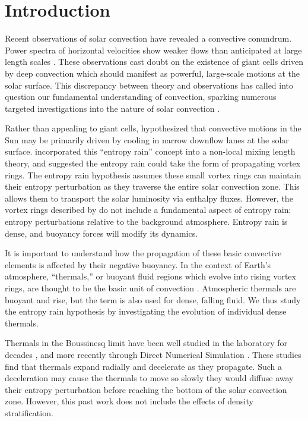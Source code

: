 \documentclass[twocolumn, amsmath, amsfonts, amssymb, trackchanges]{aastex62}
\begin{document}
\section{Introduction}
\label{sec:intro}
Recent observations of solar convection have revealed a convective conundrum.
Power spectra of horizontal velocities show weaker flows than anticipated at large length scales \citep{hanasoge&all2012, greer&all2015}.
These observations cast doubt on the existence of giant cells driven by deep convection which should manifest as powerful, large-scale motions at the solar surface. 
This discrepancy between theory and observations has called into question our fundamental understanding of convection, sparking numerous targeted investigations into the nature of solar convection  \citep{featherstone&hindman2016, omara&all2016, cossette&rast2016, kapyla&all2017, hotta2017}.

Rather than appealing to giant cells, \cite{spruit1997} hypothesized that convective motions in the Sun may be primarily driven by cooling in narrow downflow lanes at the solar surface.
\citet{brandenburg2016} incorporated this ``entropy rain'' concept into a non-local mixing length theory, and suggested the entropy rain could take the form of propagating vortex rings.
The entropy rain hypothesis assumes these small vortex rings can maintain their entropy perturbation as they traverse the entire solar convection zone.
This allows them to transport the solar luminosity via enthalpy fluxes.
However, the vortex rings described by \citet{brandenburg2016} do not include a fundamental aspect of entropy rain: entropy perturbations relative to the background atmosphere.
Entropy rain is dense, and buoyancy forces will modify its dynamics.

It is important to understand how the propagation of these basic convective elements is affected by their negative buoyancy. 
In the context of Earth's atmosphere, ``thermals,'' or buoyant fluid regions which evolve into rising vortex rings, are thought to be the basic unit of convection \citep[e.g.,][]{romps&all2015}. 
Atmospheric thermals are buoyant and rise, but the term is also used for dense, falling fluid.
We thus study the entropy rain hypothesis by investigating the evolution of individual dense thermals.

Thermals in the Boussinesq limit have been well studied in the laboratory for decades \citep[see e.g.][]{morton&all1956, scorer1957}, and more recently through Direct Numerical Simulation \citep[DNS,][]{lecoanet&jeevanjee2018}. 
These studies find that thermals expand radially and decelerate as they propagate.
Such a deceleration may cause the thermals to move so slowly they would diffuse away their entropy perturbation before reaching the bottom of the solar convection zone.
However, this past work does not include the effects of density stratification.
\end{document}
